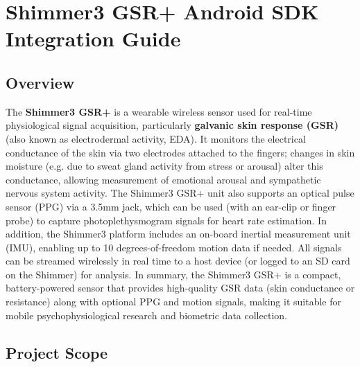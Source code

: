 \chapter{Shimmer3 GSR+ Android SDK Integration Guide}

\section{Overview}

The \textbf{Shimmer3 GSR+} is a wearable wireless sensor used for real-time
physiological signal acquisition, particularly \textbf{galvanic skin response
(GSR)} (also known as electrodermal activity,
EDA)\cite{Boucsein2012}.
It monitors the electrical conductance of the skin via two electrodes
attached to the fingers; changes in skin moisture (e.g. due to sweat
gland activity from stress or arousal) alter this conductance, allowing
measurement of emotional arousal and sympathetic nervous system
activity\cite{AppleHealthWatch2019}\cite{SamsungHealth2020}.
The Shimmer3 GSR+ unit also supports an optical pulse sensor (PPG) via a
3.5mm jack, which can be used (with an ear-clip or finger probe) to
capture photoplethysmogram signals for heart rate
estimation\cite{Fowles1981}\cite{Healey2005}.
In addition, the Shimmer3 platform includes an on-board inertial
measurement unit (IMU), enabling up to 10 degrees-of-freedom motion data
if
needed\cite{Picard2001}.
All signals can be streamed wirelessly in real time to a host device (or
logged to an SD card on the Shimmer) for
analysis\cite{DriverStressThermal2020}.
In summary, the Shimmer3 GSR+ is a compact, battery-powered sensor that
provides high-quality GSR data (skin conductance or resistance) along
with optional PPG and motion signals, making it suitable for mobile
psychophysiological research and biometric data collection.

\section{Project Scope}

